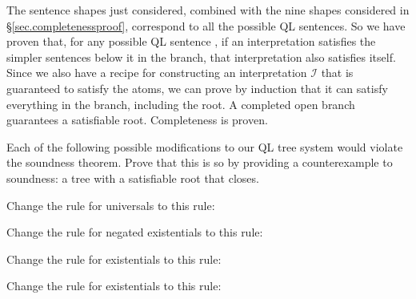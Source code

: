 The sentence shapes just considered, combined with the nine shapes considered in \S\ref{sec.completenessproof}, correspond to all the possible QL sentences. So we have proven that, for any possible QL sentence \metaA{}, if an interpretation satisfies the simpler sentences below it in the branch, that interpretation also satisfies \metaA{} itself. Since we also have a recipe for constructing an interpretation $\mathcal{I}$ that is guaranteed to satisfy the atoms, we can prove by induction that it can satisfy everything in the branch, including the root. A completed open branch guarantees a satisfiable root. Completeness is proven.

\practiceproblems

\solutions
\problempart
\label{pr.QLsoundnesscx}

Each of the following possible modifications to our QL tree system would violate the soundness theorem. Prove that this is so by providing a counterexample to soundness: a tree with a satisfiable root that closes.




\begin{earg}

\item Change the rule for universals to this rule:

\item Change the rule for negated existentials to this rule:

\item Change the rule for existentials to this rule:

\item Change the rule for existentials to this rule:

\end{earg}




